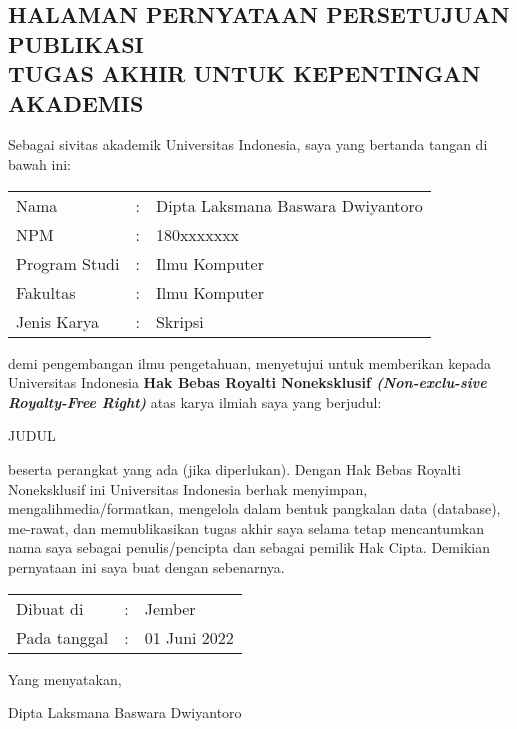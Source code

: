 \newpage
\begin{center}
    \section*{\centering HALAMAN PERNYATAAN PERSETUJUAN PUBLIKASI\\TUGAS AKHIR UNTUK KEPENTINGAN AKADEMIS}
    \vspace{-0.5cm}
    \noindent\makebox[\linewidth]{\rule{15.5cm}{0.4pt}}
\end{center}
\thispagestyle{nouniversityname}
\begin{spacing}{1.15}
    \justifying
    \noindentpar
    Sebagai sivitas akademik Universitas Indonesia, saya yang bertanda tangan di bawah ini:

    {
            \vspace{0.25cm}
            \noindent
            \begin{tabular}{@{}l c p{}}
                Nama &: & Dipta Laksmana Baswara Dwiyantoro \\
                NPM &: & 180xxxxxxx \\
                Program Studi &: & Ilmu Komputer \\
                Fakultas &: & Ilmu Komputer \\
                Jenis Karya &: & Skripsi
            \end{tabular}
            \vspace{0.25cm}   
    }

    \justifying
    \noindentpar
    demi pengembangan ilmu pengetahuan, menyetujui untuk memberikan kepada Universitas Indonesia \textbf{Hak Bebas Royalti Noneksklusif \textit{(Non-exclu-sive Royalty-Free Right)}} atas karya ilmiah saya yang berjudul:

    \begin{center}
        JUDUL
    \end{center}

    \justifying
    \noindentpar
    beserta perangkat yang ada (jika diperlukan). Dengan Hak Bebas Royalti Noneksklusif ini Universitas Indonesia berhak menyimpan, mengalihmedia/formatkan, mengelola dalam bentuk pangkalan data (database), me-rawat, dan memublikasikan tugas akhir saya selama tetap mencantumkan nama saya sebagai penulis/pencipta dan sebagai pemilik Hak Cipta.
    \noindentpar
    Demikian pernyataan ini saya buat dengan sebenarnya.
\end{spacing}
\vspace{0.5cm}

\begin{center}
    \begin{tabular}{@{}l c l}
        Dibuat di &: &Jember \\
        Pada tanggal &: &01 Juni 2022\\
    \end{tabular}
    \vspace{2cm}

    Yang menyatakan,
    \vspace{2cm}
    \par
    Dipta Laksmana Baswara Dwiyantoro
\end{center}
